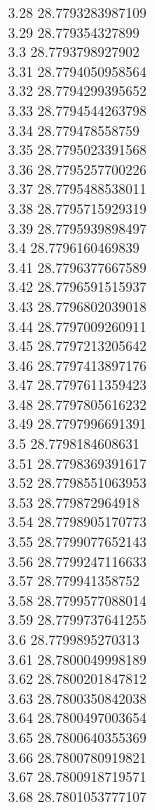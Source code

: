 {3.28	28.7793283987109\\
3.29	28.779354327899\\
3.3	28.7793798927902\\
3.31	28.7794050958564\\
3.32	28.7794299395652\\
3.33	28.7794544263798\\
3.34	28.779478558759\\
3.35	28.7795023391568\\
3.36	28.7795257700226\\
3.37	28.7795488538011\\
3.38	28.7795715929319\\
3.39	28.7795939898497\\
3.4	28.7796160469839\\
3.41	28.7796377667589\\
3.42	28.7796591515937\\
3.43	28.7796802039018\\
3.44	28.7797009260911\\
3.45	28.7797213205642\\
3.46	28.7797413897176\\
3.47	28.7797611359423\\
3.48	28.7797805616232\\
3.49	28.7797996691391\\
3.5	28.7798184608631\\
3.51	28.7798369391617\\
3.52	28.7798551063953\\
3.53	28.779872964918\\
3.54	28.7798905170773\\
3.55	28.7799077652143\\
3.56	28.7799247116633\\
3.57	28.779941358752\\
3.58	28.7799577088014\\
3.59	28.7799737641255\\
3.6	28.7799895270313\\
3.61	28.7800049998189\\
3.62	28.7800201847812\\
3.63	28.7800350842038\\
3.64	28.7800497003654\\
3.65	28.7800640355369\\
3.66	28.7800780919821\\
3.67	28.7800918719571\\
3.68	28.7801053777107\\
}
